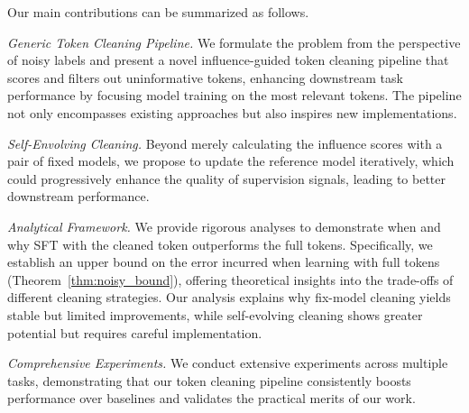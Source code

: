 Our main contributions can be summarized as follows.
\squishlist
    \item \textit{Generic Token Cleaning Pipeline.} We formulate the problem from the perspective of noisy labels and present a novel influence-guided token cleaning pipeline that scores and filters out uninformative tokens, enhancing downstream task performance by focusing model training on the most relevant tokens. The pipeline not only encompasses existing approaches but also inspires new implementations. 
    \item \textit{Self-Envolving Cleaning.} 
    Beyond merely calculating the influence scores with a pair of fixed models, we propose to update the reference model iteratively, which could progressively enhance the quality of supervision signals, leading to better downstream performance.
    \item \textit{Analytical Framework.} We provide rigorous analyses to demonstrate when and why SFT with the cleaned token outperforms the full tokens. Specifically, we establish an upper bound on the error incurred when learning with full tokens (Theorem~\ref{thm:noisy_bound}), offering theoretical insights into the trade-offs of different cleaning strategies. Our analysis explains why fix-model cleaning yields stable but limited improvements, while self-evolving cleaning shows greater potential but requires careful implementation.
    \item \textit{Comprehensive Experiments.} We conduct extensive experiments across multiple tasks, demonstrating that our token cleaning pipeline consistently boosts performance over baselines and validates the practical merits of our work.
\squishend
